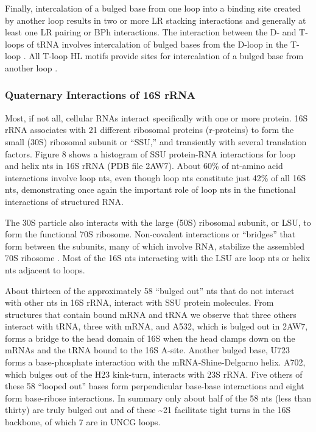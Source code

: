 Finally, intercalation of a bulged base from one loop into a binding site
created by another loop results in two or more LR stacking interactions and
generally at least one LR pairing or BPh interactions. The interaction between
the D- and T-loops of tRNA involves intercalation of bulged bases from the
D-loop in the T-loop \cite{Quigley1976}. All T-loop HL motifs provide sites for
intercalation of a bulged base from another loop \cite{Nagaswamy2002}. 

\subsubsection{Quaternary Interactions of 16S rRNA}

Most, if not all, cellular RNAs interact specifically with one or more protein.
\EC{} 16S rRNA associates with 21 different ribosomal proteins (r-proteins) to
form the small (30S) ribosomal subunit or “SSU,” and transiently with several
translation factors. Figure 8 shows a histogram of SSU protein-RNA interactions
for loop and helix nts in 16S rRNA (PDB file 2AW7). About 60\% of nt-amino acid
interactions involve loop nts, even though loop nts constitute just 42\% of all
16S nts, demonstrating once again the important role of loop nts in the
functional interactions of structured RNA.

The 30S particle also interacts with the large (50S) ribosomal subunit, or LSU,
to form the functional 70S ribosome. Non-covalent interactions or ``bridges''
that form between the subunits, many of which involve RNA, stabilize the
assembled 70S ribosome \cite{Yusupov2001}. Most of the 16S nts interacting with
the LSU are loop nts or helix nts adjacent to loops. 

About thirteen of the approximately 58 ``bulged out'' nts that do not interact
with other nts in \EC{} 16S rRNA, interact with SSU protein molecules. From
structures that contain bound mRNA and tRNA we observe that three others
interact with tRNA, three with mRNA, and A532, which is bulged out in 2AW7,
forms a bridge to the head domain of 16S when the head clamps down on the mRNAs
and the tRNA bound to the 16S A-site. Another bulged base, U723 forms a
base-phosphate interaction with the mRNA-Shine-Delgarno helix. A702, which
bulges out of the H23 kink-turn, interacts with 23S rRNA. Five others of these
58 ``looped out'' bases form perpendicular base-base interactions and eight form
base-ribose interactions. In summary only about half of the 58 nts (less than
thirty) are truly bulged out and of these \textasciitilde 21 facilitate tight turns in the 16S
backbone, of which 7 are in UNCG loops. 

